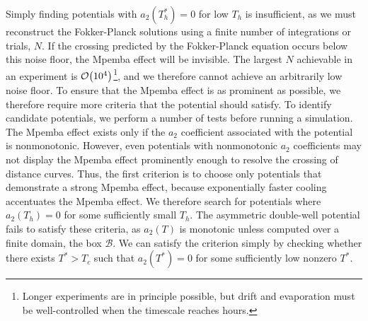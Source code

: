 \documentclass[hyperref={colorlinks=true, urlcolor=blue, citecolor=blue, final, bound}]{sfuthesis}
\begin{document}
Simply finding potentials with $a_2(T_h^*)=0$ for low $T_h$ is insufficient, as we must reconstruct the Fokker-Planck solutions using a finite number of integrations or trials, $N$. If the crossing predicted by the Fokker-Planck equation occurs below this noise floor, the Mpemba effect will be invisible. The largest $N$ achievable in an experiment is $\order{10^4}$\footnote{Longer experiments are in principle possible, but drift and evaporation must be well-controlled when the timescale reaches hours.}, and we therefore cannot achieve an arbitrarily low noise floor. To ensure that the Mpemba effect is as prominent as possible, we therefore require more criteria that the potential should satisfy.
To identify candidate potentials, we perform a number of tests before running a simulation. The Mpemba effect exists only if the $a_2$ coefficient associated with the potential is nonmonotonic. However, even potentials with nonmonotonic $a_2$ coefficients may not display the Mpemba effect prominently enough to resolve the crossing of distance curves. Thus, the first criterion is to choose only potentials that demonstrate a strong Mpemba effect, because exponentially faster cooling accentuates the Mpemba effect. We therefore search for potentials where $a_2(T_h) = 0$ for some sufficiently small $T_h$. The asymmetric double-well potential fails to satisfy these criteria, as $a_2(T)$ is monotonic unless computed over a finite domain, the box $\mathcal B$. We can satisfy the criterion simply by checking whether there exists $T^*>T_c$ such that $a_2(T^*)=0$ for some sufficiently low nonzero $T^*$. 
\end{document}
